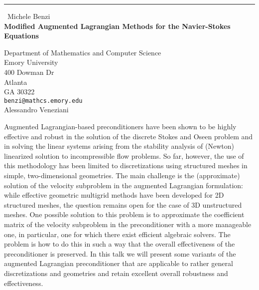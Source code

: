 \documentclass{report}
\begin{document}
\begin{center}
\rule{6in}{1pt} \
{\large Michele Benzi \\
{\bf Modified Augmented Lagrangian Methods for the Navier-Stokes Equations}}

Department of Mathematics and Computer Science \\ Emory University \\ 400 Dowman Dr \\ Atlanta \\ GA 30322
\\
{\tt benzi@mathcs.emory.edu}\\
Alessandro Veneziani\end{center}

Augmented Lagrangian-based preconditioners have been shown to be highly
effective and robust in the solution of the discrete Stokes and Oseen problem
and in solving the linear systems arising from the stability analysis of
(Newton) linearized solution to incompressible flow problems. So far, however,
the use of this methodology has been limited to discretizations using
structured meshes in simple, two-dimensional geometries. The main challenge
is the (approximate) solution of the velocity subproblem in the augmented
Lagrangian formulation: while effective geometric multigrid methods have been
developed for 2D structured meshes, the question remains open for the case of
3D unstructured meshes. One possible solution to this problem is to approximate
the coefficient matrix of the velocity subproblem in the preconditioner
with a more manageable one, in particular, one for which there exist
efficient algebraic solvers. The problem is how to do this in such a way
that the overall effectiveness of the preconditioner is preserved.
In this talk we will present some variants of the augmented Lagrangian
preconditioner that are applicable to rather general discretizations
and geometries and retain excellent overall robustness and effectiveness.
\end{document}
